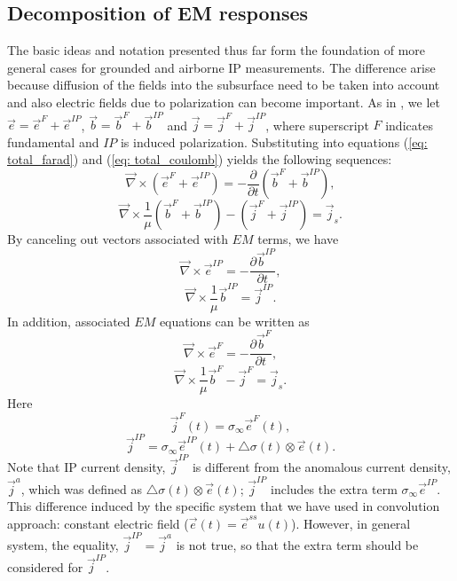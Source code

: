 \documentclass[a4paper, 11pt]{article}
\newcommand{\curl}{{\vec \nabla}\times}
\newcommand{\siginf}{\sigma_\infty}
\newcommand{\dsig}{\triangle\sigma}
\renewcommand {\j}  { {\vec j} }
\renewcommand {\b}  { {\vec b} }
\newcommand {\e}  { {\vec e} }
\begin{document}
\subsection{Decomposition of EM responses}
The basic ideas and notation presented thus far form the foundation of more general cases for grounded and airborne IP measurements. The difference arise because diffusion of the fields into the subsurface need to be taken into account and also electric fields due to polarization can become important. As in \cite{Smith1988a}, we let $\e = \e^{F} + \e^{IP}$, $\b = \b^{F} + \b^{IP}$ and $\j = \j^{F} + \j^{IP}$, where superscript $F$ indicates fundamental and $IP$ is induced polarization.
Substituting into equations (\ref{eq: total_farad}) and (\ref{eq: total_coulomb}) yields the following sequences:
\begin{equation}
  \curl({\e^{F}+\e^{IP}}) = -\frac{\partial}{\partial t} (\b^{F}+\b^{IP}),
\end{equation}
\begin{equation}
  \curl\frac{1}{\mu}(\b^{F}+\b^{IP}) - (\j^{F}+\j^{IP})= \j_{s}.
\end{equation}
By canceling out vectors associated with $EM$ terms, we have
\begin{equation}
  \curl \e^{IP} = -\frac{\partial \b^{IP}}{\partial t},
  \label{eq: eq_secondary_farad}
\end{equation}
\begin{equation}
  \curl{\frac{1}{\mu}\b^{IP}} = \j^{IP}.
  \label{eq: eq_secondary_coulomb}
\end{equation}
In addition, associated $EM$ equations can be written as
\begin{equation}
  \curl \e^{F} = -\frac{\partial \b^{F}}{\partial t},
  \label{eq: eq_primary_farad}
\end{equation}
\begin{equation}
  \curl{\frac{1}{\mu}\b^{F}} -\j^{F} = \j_s.
  \label{eq: eq_primary_coulomb}
\end{equation}
Here
\begin{equation}
  \j^{F}(t) = \siginf\e^{F}(t),
  \label{eq: jF}
\end{equation}
\begin{equation}
  \j^{IP} = \siginf\e^{IP}(t) + \dsig(t)\otimes\e(t).
  \label{eq: jIP}
\end{equation}
Note that IP current density, $\j^{IP}$ is different from the anomalous current density, $\j^a$, which was defined as $\dsig(t)\otimes\e(t)$; $\j^{IP}$ includes the extra term $\siginf\e^{IP}$. This difference induced by the specific system that we have used in convolution approach: constant electric field ($\e(t) = \e^{ss}u(t)$). However, in general system, the equality, $\j^{IP}=\j^a$ is not true, so that the extra term should be considered for $\j^{IP}$.
\end{document}
